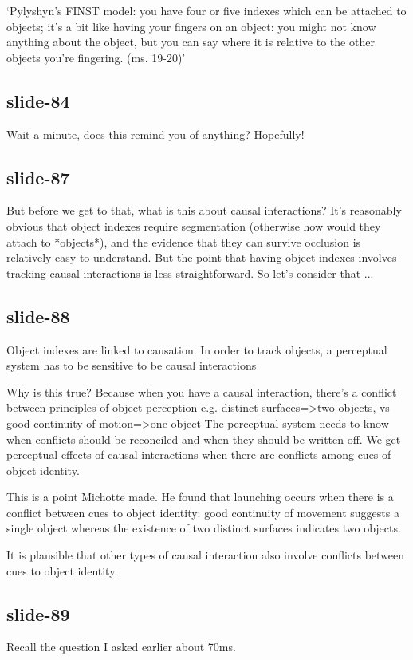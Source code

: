 \documentclass[12pt,\papersize]{extarticle}
\begin{document}
‘Pylyshyn’s FINST model: you have four or five indexes which can be attached to objects; 
it’s a bit like having your fingers on an object: you might not know anything about the object, but you can say where it is relative to the other objects you’re fingering. (ms. 19-20)’ \citep{Scholl:1999mi}
 
\subsection{slide-84}
Wait a minute, does this remind you of anything?  Hopefully!
 
\subsection{slide-87}
But before we get to that, what is this about causal interactions?
It's reasonably obvious that object indexes require segmentation (otherwise how would they
attach to *objects*), and the evidence that they can survive occlusion is relatively easy to
understand.  But the point that having object indexes involves tracking causal interactions
is less straightforward.  So let's consider that ...
 
\subsection{slide-88}
Object indexes are linked to causation.
In order to track objects, a perceptual system has to be sensitive to be causal interactions
 
Why is this true?
Because when you have a causal interaction, there's a conflict between principles of object 
perception e.g. distinct surfaces=>two objects, vs good continuity of motion=>one object
The perceptual system needs to know when conflicts should be reconciled and when they should 
be written off.
We get perceptual effects of causal interactions when there are conflicts among cues of object 
identity.
 
This is a point Michotte made.  He found that launching occurs when there is a conflict between 
cues to object identity: good continuity of movement suggests a single object whereas the 
existence of two distinct surfaces indicates two objects.
 
It is plausible that other types of causal interaction also involve conflicts between cues 
to object identity.
 
\subsection{slide-89}
Recall the question I asked earlier about 70ms.
 
\end{document}
